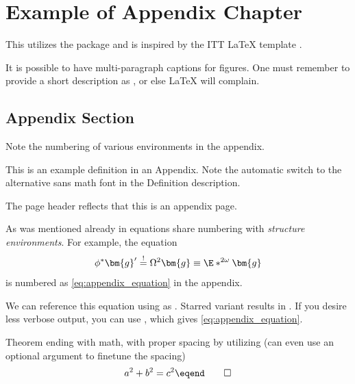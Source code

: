 \chapter{Example of Appendix Chapter} \label{appendix:example}

\begin{example}
  This utilizes the  package and is inspired by the ITT \LaTeX{} template \autocite{ITTtemplate}.
\end{example}

\clearpage
\begin{example}
    It is possible to have multi-paragraph captions for figures.
    One must remember to provide a short description as , or else \LaTeX{} will complain.

\end{example}
\section{Appendix Section}%
\label{sec:Appendix Section}

Note the numbering of various environments in the appendix.

\begin{definition}
    This is an example definition in an Appendix.
    Note the automatic switch to the alternative sans math font in the Definition description.
\end{definition}

\begin{remark}
    The page header reflects that this is an appendix page.
\end{remark}

\begin{example}
    As was mentioned already in equations share numbering with \emph{structure environments}.
    For example, the equation
    \begin{equation} \label{eq:appendix_equation}
        \phi^{*}\bm{g}' \overset{!}{=} \Omega^{2}\bm{g} \equiv \E*^{2\omega}\bm{g}
    \end{equation}
    is numbered as \eqref{eq:appendix_equation} in the appendix.

    We can reference this equation using \custommacro{\Cref} as .
    Starred variant \custommacro{\Cref*} results in .
    If you desire less verbose output, you can use \macro{\eqref}, which gives \eqref{eq:appendix_equation}.
\end{example}

\begin{theorem}
    Theorem ending with math, with proper spacing by utilizing \custommacro{\qedhere} (can even use an optional argument to finetune the spacing)
    \[
        a^{2}+b^{2}=c^{2} \eqend \qedhere
    \]
\end{theorem}
